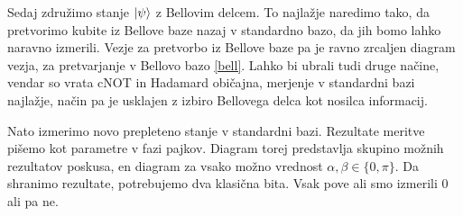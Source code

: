 \documentclass[mat1]{fmfdelo}
\begin{document}
Sedaj združimo stanje \(\ket{\psi}\) z Bellovim delcem. To najlažje naredimo tako, da pretvorimo kubite iz Bellove baze nazaj v standardno bazo, da jih bomo lahko naravno izmerili. Vezje za pretvorbo iz Bellove baze pa je ravno zrcaljen diagram vezja, za pretvarjanje v Bellovo bazo \ref{bell}. Lahko bi ubrali tudi druge načine, vendar so vrata \textsf{cNOT} in Hadamard običajna, merjenje v standardni bazi najlažje, način pa je usklajen z izbiro Bellovega delca kot nosilca informacij.
\begin{center}
\end{center}
Nato izmerimo novo prepleteno stanje v standardni bazi. Rezultate meritve pišemo kot parametre v fazi pajkov. Diagram torej predstavlja skupino možnih rezultatov poskusa, en diagram za vsako možno vrednost \(\alpha,\beta\in\{0,\pi\}\). Da shranimo rezultate, potrebujemo dva klasična bita. Vsak pove ali smo izmerili \(0\) ali pa ne.
\end{document}
